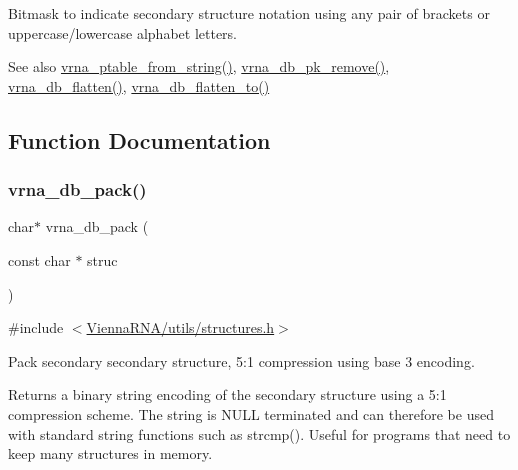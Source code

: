 Bitmask to indicate secondary structure notation using any pair of brackets or uppercase/lowercase alphabet letters. 

\begin{DoxySeeAlso}{See also}
\mbox{\hyperlink{group__struct__utils__pair__table_gac76c9ef3de507748fb0416a59323362b}{vrna\+\_\+ptable\+\_\+from\+\_\+string()}}, \mbox{\hyperlink{group__struct__utils__dot__bracket_ga97dbebaa3fc49524cf5afa338a6c52ee}{vrna\+\_\+db\+\_\+pk\+\_\+remove()}}, \mbox{\hyperlink{group__struct__utils__dot__bracket_gafd1304f5a86e2e3f1425e725cde44fa2}{vrna\+\_\+db\+\_\+flatten()}}, \mbox{\hyperlink{group__struct__utils__dot__bracket_ga690425199c8b71545e7196e3af1436f8}{vrna\+\_\+db\+\_\+flatten\+\_\+to()}} 
\end{DoxySeeAlso}


\subsection{Function Documentation}
\mbox{\label{group__struct__utils__dot__bracket_ga55c4783060a1464f862f858d5599c9e1}} 
\subsubsection{\texorpdfstring{vrna\_db\_pack()}{vrna\_db\_pack()}}
{\footnotesize\ttfamily char$\ast$ vrna\+\_\+db\+\_\+pack (\begin{DoxyParamCaption}\item[{const char $\ast$}]{struc }\end{DoxyParamCaption})}



{\ttfamily \#include $<$\mbox{\hyperlink{utils_2structures_8h}{Vienna\+R\+N\+A/utils/structures.\+h}}$>$}



Pack secondary secondary structure, 5\+:1 compression using base 3 encoding. 

Returns a binary string encoding of the secondary structure using a 5\+:1 compression scheme. The string is N\+U\+LL terminated and can therefore be used with standard string functions such as strcmp(). Useful for programs that need to keep many structures in memory.

